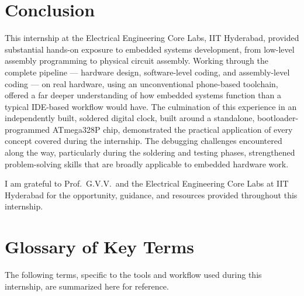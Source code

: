 \documentclass[12pt,a4paper]{report}
\begin{document}
\chapter{Conclusion}
\label{ch:conclusion}

This internship at the Electrical Engineering Core Labs, IIT Hyderabad, provided substantial hands-on exposure to embedded systems development, from low-level assembly programming to physical circuit assembly. Working through the complete pipeline --- hardware design, software-level coding, and assembly-level coding --- on real hardware, using an unconventional phone-based toolchain, offered a far deeper understanding of how embedded systems function than a typical IDE-based workflow would have. The culmination of this experience in an independently built, soldered digital clock, built around a standalone, bootloader-programmed ATmega328P chip, demonstrated the practical application of every concept covered during the internship. The debugging challenges encountered along the way, particularly during the soldering and testing phases, strengthened problem-solving skills that are broadly applicable to embedded hardware work.

I am grateful to Prof.\ G.V.V.\ and the Electrical Engineering Core Labs at IIT Hyderabad for the opportunity, guidance, and resources provided throughout this internship.

\appendix

\chapter{Glossary of Key Terms}
\label{app:glossary}

The following terms, specific to the tools and workflow used during this internship, are summarized here for reference.
\end{document}

